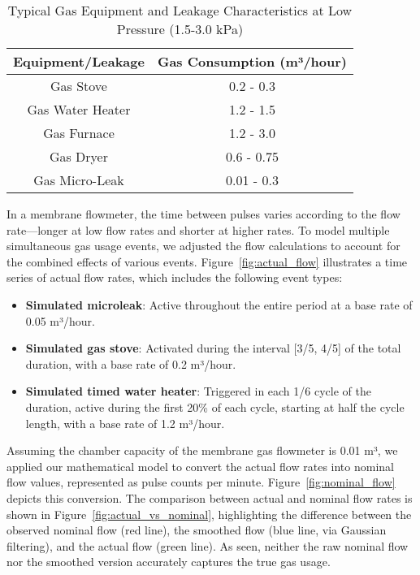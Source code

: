 \documentclass[10pt, sigconf]{acmart}
\begin{document}
\begin{table}[htbp]  %
  \caption{Typical Gas Equipment and Leakage Characteristics at Low Pressure (1.5-3.0 kPa)}
  \label{tab:gas_consumption}
  \begin{tabular}{cc}
    \toprule
    Equipment/Leakage & Gas Consumption (m³/hour) \\
    \midrule
    Gas Stove         & 0.2 - 0.3                 \\
    Gas Water Heater  & 1.2 - 1.5                 \\
    Gas Furnace       & 1.2 - 3.0                 \\
    Gas Dryer         & 0.6 - 0.75                \\
    Gas Micro-Leak    & 0.01 - 0.3               \\
    \bottomrule
  \end{tabular}
\end{table}

In a membrane flowmeter, the time between pulses varies according to the flow rate—longer at low flow rates and shorter at higher rates. To model multiple simultaneous gas usage events, we adjusted the flow calculations to account for the combined effects of various events. Figure~\ref{fig:actual_flow} illustrates a time series of actual flow rates, which includes the following event types:

\begin{itemize}
  \item \textbf{Simulated microleak}: Active throughout the entire period at a base rate of 0.05 m³/hour.
  \item \textbf{Simulated gas stove}: Activated during the interval [3/5, 4/5] of the total duration, with a base rate of 0.2 m³/hour.
  \item \textbf{Simulated timed water heater}: Triggered in each 1/6 cycle of the duration, active during the first 20\% of each cycle, starting at half the cycle length, with a base rate of 1.2 m³/hour.
\end{itemize}

Assuming the chamber capacity of the membrane gas flowmeter is 0.01 m³, we applied our mathematical model to convert the actual flow rates into nominal flow values, represented as pulse counts per minute. Figure~\ref{fig:nominal_flow} depicts this conversion. The comparison between actual and nominal flow rates is shown in Figure~\ref{fig:actual_vs_nominal}, highlighting the difference between the observed nominal flow (red line), the smoothed flow (blue line, via Gaussian filtering), and the actual flow (green line). As seen, neither the raw nominal flow nor the smoothed version accurately captures the true gas usage.
\end{document}
